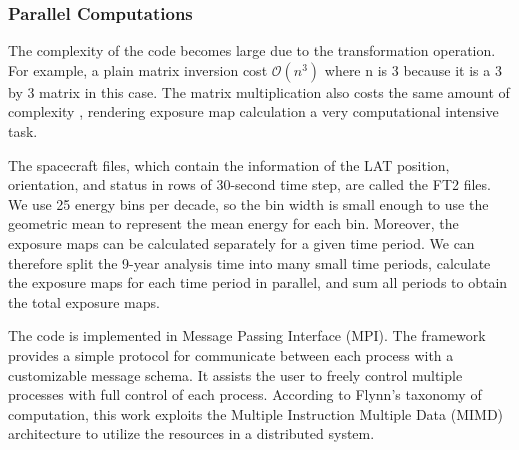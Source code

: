 \subsubsection{Parallel Computations}

The complexity of 
the code becomes large due to the transformation operation.
For example, a plain matrix inversion cost $\mathcal{O}(n^3)$ where 
n is 3 because it is a 3 by 3 matrix in this case.
The matrix multiplication also costs the same amount of
complexity
, rendering exposure map calculation a
very computational intensive task.

The spacecraft files, which contain the information of the LAT
position, orientation, and status in rows of 30-second time step,
are called the FT2 files. We use 25 energy bins per decade,
so the bin width is small enough to use the geometric mean
to represent the mean energy for each bin. 
Moreover, the exposure maps can be calculated separately
for a given time period. We can therefore split the
9-year analysis time into many small time periods,
calculate the exposure maps for each time period
in parallel, and sum all periods to obtain
the total exposure maps.

The code is implemented
in Message Passing Interface (MPI). The framework provides 
a simple protocol for communicate between each process
with a customizable message schema.
It assists the user to 
freely control multiple processes with full control of 
each process. According to Flynn's taxonomy of computation,
this work exploits the Multiple Instruction Multiple Data (MIMD)
architecture to utilize the resources in a distributed system.

